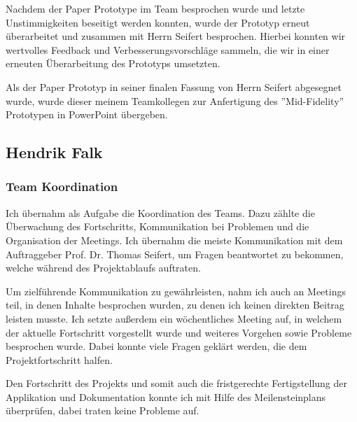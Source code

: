 Nachdem der Paper Prototype im Team besprochen wurde und letzte Unstimmigkeiten beseitigt werden konnten, wurde der Prototyp erneut überarbeitet und zusammen mit Herrn Seifert besprochen. Hierbei konnten wir wertvolles Feedback und Verbesserungsvorschläge sammeln, die wir in einer erneuten Überarbeitung des Prototyps umsetzten. 

Als der Paper Prototyp in seiner finalen Fassung von Herrn Seifert abgesegnet wurde, wurde dieser meinem Teamkollegen zur Anfertigung des ''Mid-Fidelity'' Prototypen in PowerPoint übergeben.

\clearpage

\subsection{Hendrik Falk}

\subsubsection{Team Koordination}

Ich übernahm als Aufgabe die Koordination des Teams. Dazu zählte die Überwachung des Fortschritts, Kommunikation bei Problemen und die Organisation der Meetings. Ich übernahm die meiste Kommunikation mit dem Auftraggeber Prof. Dr. Thomas Seifert, um Fragen beantwortet zu bekommen, welche während des Projektablaufs auftraten. 

Um zielführende Kommunikation zu gewährleisten, nahm ich auch an Meetings teil, in denen Inhalte besprochen wurden, zu denen ich keinen direkten Beitrag leisten musste. Ich setzte außerdem ein wöchentliches Meeting auf, in welchem der aktuelle Fortschritt vorgestellt wurde und weiteres Vorgehen sowie Probleme besprochen wurde. Dabei konnte viele Fragen geklärt werden, die dem Projektfortschritt halfen. 

Den Fortschritt des Projekts und somit auch die fristgerechte Fertigstellung der Applikation und Dokumentation konnte ich mit Hilfe des Meilensteinplans überprüfen, dabei traten keine Probleme auf. 

\vspace{1em}

